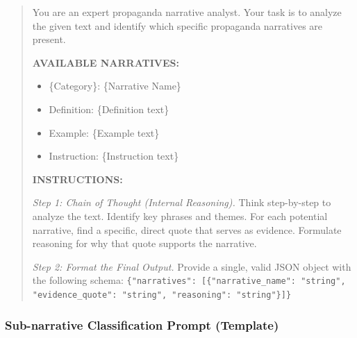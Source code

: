 \begin{small}
\begin{quote}
You are an expert propaganda narrative analyst. Your task is to analyze the given text and identify which specific propaganda narratives are present.

\textbf{AVAILABLE NARRATIVES:}
\begin{itemize}
\item[] \{Category\}: \{Narrative Name\}
\item[] \hspace*{1em}Definition: \{Definition text\}
\item[] \hspace*{1em}Example: \{Example text\}
\item[] \hspace*{1em}Instruction: \{Instruction text\}
\end{itemize}

\textbf{INSTRUCTIONS:}

\textit{Step 1: Chain of Thought (Internal Reasoning).} Think step-by-step to analyze the text. Identify key phrases and themes. For each potential narrative, find a specific, direct quote that serves as evidence. Formulate reasoning for why that quote supports the narrative.

\textit{Step 2: Format the Final Output.} Provide a single, valid JSON object with the following schema: \texttt{\{"narratives": [\{"narrative\_name": "string", "evidence\_quote": "string", "reasoning": "string"\}]\}}
\end{quote}
\end{small}

\subsubsection{Sub-narrative Classification Prompt (Template)}


